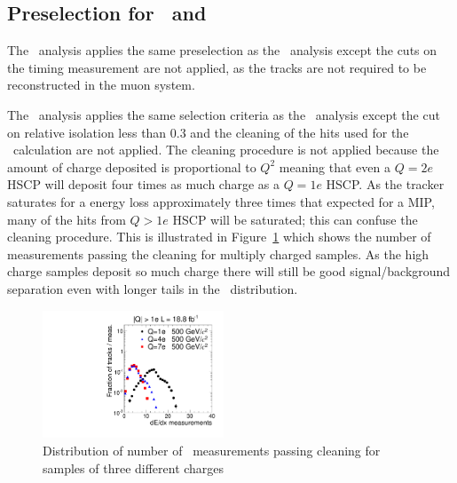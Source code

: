 \subsection{Preselection for \tkonly\ and \multi\ \label{sec:otherpreselection}}

The \tkonly\ analysis applies the same preselection as the \tktof\ analysis except the cuts on the timing measurement are not applied, as the tracks
are not required to be reconstructed in the muon system. 

The \multi\ analysis applies
the same selection criteria as the \tktof\ analysis except the cut on relative isolation less than 0.3 and the cleaning of the hits used for the \dedx\ calculation
are not applied. The cleaning procedure is not applied because the amount of charge deposited is proportional to $Q^2$ meaning that even a $Q=2e$ HSCP will
deposit four times as much charge as a $Q=1e$ HSCP. As the tracker saturates for a energy loss approximately three times that expected for a MIP, many of the hits from $Q>1e$ HSCP
will be saturated; this can confuse the cleaning procedure. 
This is illustrated in Figure~\ref{fig:Multi} which shows the number of measurements passing the cleaning for multiply charged samples.
As the high charge samples deposit so much charge there will still be good signal/background separation even with longer tails in the \dedx\ distribution.

\begin{figure}
\centering
  \includegraphics[clip=false, trim=0.0cm 0cm 0.0cm 0cm, width=0.48\textwidth]{figures/multi/Selection_Comp_8TeV_DY_QG_NOM_BS}
  \caption{Distribution of number of \dedx\ measurements passing cleaning for samples of three different charges
    \label{fig:Multi}}
\end{figure}

